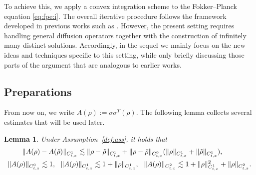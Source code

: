 \documentclass[10pt,a4paper]{amsart}
\numberwithin{equation}{section}
\newtheorem{lemma}[theorem]{Lemma}
\begin{document}
To achieve this, we apply a convex integration scheme to the Fokker--Planck equation \eqref{eq:fpe:i}. 
The overall iterative procedure follows the framework developed in previous works such as \cite{LRZ25,LR25}. 
However, the present setting requires handling general diffusion operators together with the construction of infinitely many distinct solutions. 
Accordingly, in the sequel we mainly focus on the new ideas and techniques specific to this setting, while only briefly discussing those parts of the argument that are analogous to earlier works.  

\subsection{Preparations} 
From now on, we write
$
A(\rho):=\sigma\sigma^T(\rho).
$
The following lemma collects several estimates that will be used later.

\begin{lemma}\label{lem:A}
Under Assumption~\ref{def:ass}, it holds that
\begin{align}
\|A(\rho)&-A(\tilde{\rho})\|_{C_{t,x}^1}
\lesssim
   \|\rho- \tilde{\rho} \|_{C_{t,x}^1}+\|\rho- \tilde{\rho} \|_{C_{t,x}^0}(\|\rho \|_{C_{t,x}^1}+\|\tilde\rho \|_{C_{t,x}^1}),
\notag\\
\|A(\rho)\|_{C_{t,x}^0}
&\lesssim 1,
\notag\ \
\|A(\rho)\|_{C_{t,x}^1}
\lesssim 1+\|\rho\|_{C_{t,x}^1},\ \ \|A(\rho)\|_{C_{t,x}^2}
\lesssim 1+\|\rho\|_{C_{t,x}^1}^2+\|\rho\|_{C_{t,x}^2}.
\notag
\end{align}
\end{lemma}
\end{document}

